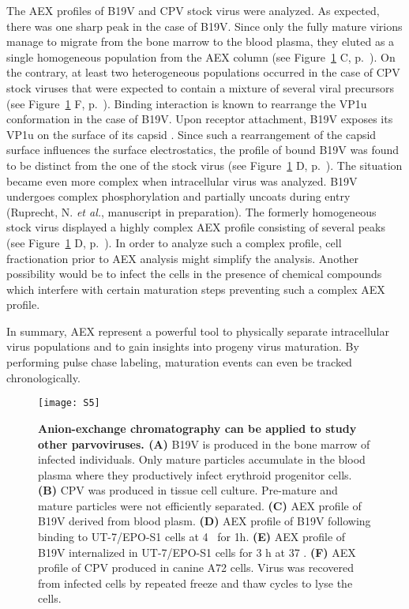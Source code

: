 The AEX profiles of B19V and CPV stock virus were analyzed. As expected, there was one sharp peak in the case of B19V. Since only the fully mature virions manage to migrate from the bone marrow to the blood plasma, they eluted as a single homogeneous population from the AEX column (see Figure~\ref{S5} C, p.~\pageref{S5}). On the contrary, at least two heterogeneous populations occurred in the case of CPV stock viruses that were expected to contain a mixture of several viral precursors (see Figure~\ref{S5} F, p.~\pageref{S5}). Binding interaction is known to rearrange the VP1u conformation in the case of B19V. Upon receptor attachment, B19V exposes its VP1u on the surface of its capsid \cite{pmid20826697}. Since such a rearrangement of the capsid surface influences the surface electrostatics, the profile of bound B19V was found to be distinct from the one of the stock virus (see Figure~\ref{S5} D, p.~\pageref{S5}). The situation became even more complex when intracellular virus was analyzed. B19V undergoes complex phosphorylation and partially uncoats during entry (Ruprecht, N. \textit{et al.}, manuscript in preparation). The formerly homogeneous stock virus displayed a highly complex AEX profile consisting of several peaks (see Figure~\ref{S5} D, p.~\pageref{S5}). In order to analyze such a complex profile, cell fractionation prior to AEX analysis might simplify the analysis. Another possibility would be to infect the cells in the presence of chemical compounds which interfere with certain maturation steps preventing such a complex AEX profile. 

In summary, AEX represent a powerful tool to physically separate intracellular virus populations and to gain insights into progeny virus maturation. By performing pulse chase labeling, maturation events can even be tracked chronologically.         
 






\begin{figure}
\centering
  \texttt{[image: S5]}
  \caption[]
   {\textbf{Anion-exchange chromatography can be applied to study other parvoviruses. (A)} B19V is produced in the bone marrow of infected individuals. Only mature particles accumulate in the blood plasma where they productively infect erythroid progenitor cells. \textbf{(B)} CPV was produced in tissue cell culture. Pre-mature and mature particles were not efficiently separated. \textbf{(C)} AEX profile of B19V derived from blood plasm. \textbf{(D)} AEX profile of B19V following binding to UT-7/EPO-S1 cells at 4 \textcelsius~for 1h. \textbf{(E)} AEX profile of B19V internalized in UT-7/EPO-S1 cells for 3 h at 37 \textcelsius.  \textbf{(F)} AEX profile of CPV produced in canine A72 cells. Virus was recovered from infected cells by repeated freeze and thaw cycles to lyse the cells.} 
\label{S5}
\end{figure}





    




\renewcommand\thefigure{\thechapter.\arabic{figure}} 

